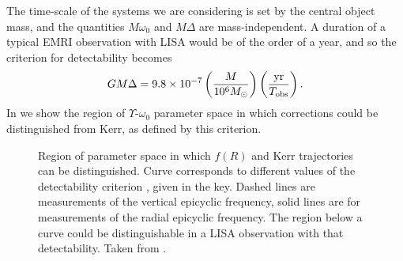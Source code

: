 The time-scale of the systems we are considering is set by the central object mass, and the quantities $M\omega_0$ and $M\Delta$ are mass-independent. A duration of a typical EMRI observation with LISA would be of the order of a year, and so the criterion for detectability becomes \citep{Berry2011}
\begin{equation}
GM\Delta = 9.8\times10^{-7} \left(\dfrac{M}{10^6 M_{\odot}}\right) \left(\dfrac{\mathrm{yr}}{T_\mathrm{obs}}\right). \label{eq:detcrit}
\end{equation}
In  we show the region of $\Upsilon$-$\omega_0$ parameter space in which corrections could be distinguished from Kerr, as defined by this criterion.
\begin{figure}%
\centering
{}
\quad{}
\caption{Region of parameter space in which $f(R)$ and Kerr trajectories can be distinguished. Curve corresponds to different values of the detectability criterion , given in the key. Dashed lines are measurements of the vertical epicyclic frequency, solid lines are for measurements of the radial epicyclic frequency. The region below a curve could be distinguishable in a LISA observation with that detectability. Taken from \citet{Berry2011}.}
\label{fig:epifig}
\end{figure}
